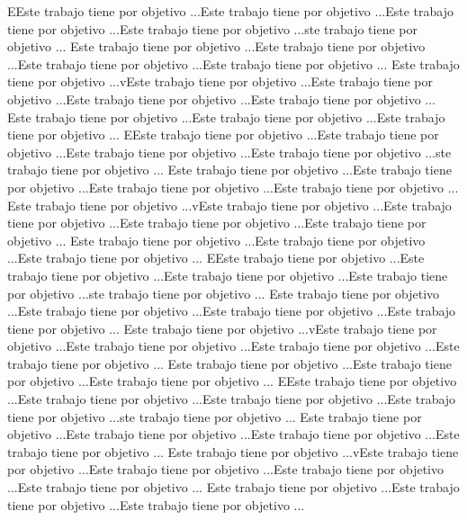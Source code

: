 EEste trabajo tiene por objetivo ...Este trabajo tiene por objetivo ...Este trabajo tiene por objetivo ...Este trabajo tiene por objetivo ...ste trabajo tiene por objetivo ...
Este trabajo tiene por objetivo ...Este trabajo tiene por objetivo ...Este trabajo tiene por objetivo ...Este trabajo tiene por objetivo ...
Este trabajo tiene por objetivo ...vEste trabajo tiene por objetivo ...Este trabajo tiene por objetivo ...Este trabajo tiene por objetivo ...Este trabajo tiene por objetivo ...
Este trabajo tiene por objetivo ...Este trabajo tiene por objetivo ...Este trabajo tiene por objetivo ...
EEste trabajo tiene por objetivo ...Este trabajo tiene por objetivo ...Este trabajo tiene por objetivo ...Este trabajo tiene por objetivo ...ste trabajo tiene por objetivo ...
Este trabajo tiene por objetivo ...Este trabajo tiene por objetivo ...Este trabajo tiene por objetivo ...Este trabajo tiene por objetivo ...
Este trabajo tiene por objetivo ...vEste trabajo tiene por objetivo ...Este trabajo tiene por objetivo ...Este trabajo tiene por objetivo ...Este trabajo tiene por objetivo ...
Este trabajo tiene por objetivo ...Este trabajo tiene por objetivo ...Este trabajo tiene por objetivo ...
EEste trabajo tiene por objetivo ...Este trabajo tiene por objetivo ...Este trabajo tiene por objetivo ...Este trabajo tiene por objetivo ...ste trabajo tiene por objetivo ...
Este trabajo tiene por objetivo ...Este trabajo tiene por objetivo ...Este trabajo tiene por objetivo ...Este trabajo tiene por objetivo ...
Este trabajo tiene por objetivo ...vEste trabajo tiene por objetivo ...Este trabajo tiene por objetivo ...Este trabajo tiene por objetivo ...Este trabajo tiene por objetivo ...
Este trabajo tiene por objetivo ...Este trabajo tiene por objetivo ...Este trabajo tiene por objetivo ...
EEste trabajo tiene por objetivo ...Este trabajo tiene por objetivo ...Este trabajo tiene por objetivo ...Este trabajo tiene por objetivo ...ste trabajo tiene por objetivo ...
Este trabajo tiene por objetivo ...Este trabajo tiene por objetivo ...Este trabajo tiene por objetivo ...Este trabajo tiene por objetivo ...
Este trabajo tiene por objetivo ...vEste trabajo tiene por objetivo ...Este trabajo tiene por objetivo ...Este trabajo tiene por objetivo ...Este trabajo tiene por objetivo ...
Este trabajo tiene por objetivo ...Este trabajo tiene por objetivo ...Este trabajo tiene por objetivo ...


